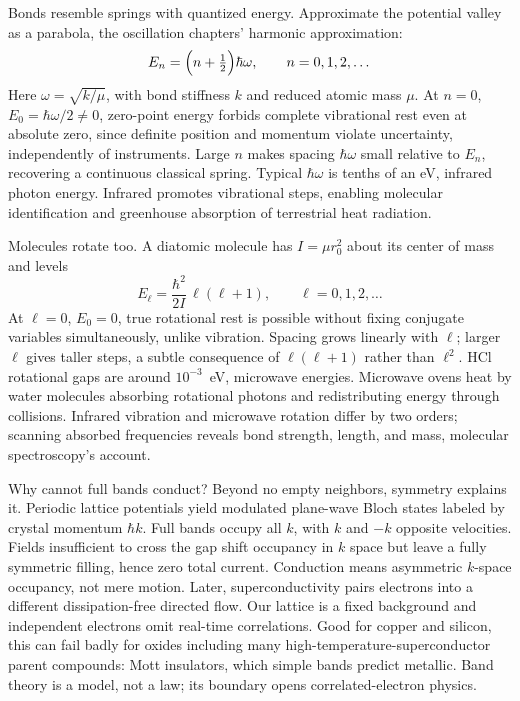 \begin{mathbridge}
Bonds resemble springs with quantized energy. Approximate the potential valley as a parabola, the oscillation chapters' harmonic approximation:
\[
E_n=\Bigl(n+\tfrac12\Bigr)\hbar\omega,\qquad n=0,1,2,\dots
\]
Here \(\omega=\sqrt{k/\mu}\), with bond stiffness \(k\) and reduced atomic mass \(\mu\). At \(n=0\), \(E_0=\hbar\omega/2\neq0\), zero-point energy forbids complete vibrational rest even at absolute zero, since definite position and momentum violate uncertainty, independently of instruments. Large \(n\) makes spacing \(\hbar\omega\) small relative to \(E_n\), recovering a continuous classical spring. Typical \(\hbar\omega\) is tenths of an eV, infrared photon energy. Infrared promotes vibrational steps, enabling molecular identification and greenhouse absorption of terrestrial heat radiation.

Molecules rotate too. A diatomic molecule has \(I=\mu r_0^2\) about its center of mass and levels
\[
E_\ell=\frac{\hbar^2}{2I}\,\ell(\ell+1),\qquad \ell=0,1,2,\dots
\]
At \(\ell=0\), \(E_0=0\), true rotational rest is possible without fixing conjugate variables simultaneously, unlike vibration. Spacing grows linearly with \(\ell\); larger \(\ell\) gives taller steps, a subtle consequence of \(\ell(\ell+1)\) rather than \(\ell^2\). HCl rotational gaps are around \(10^{-3}\)~eV, microwave energies. Microwave ovens heat by water molecules absorbing rotational photons and redistributing energy through collisions. Infrared vibration and microwave rotation differ by two orders; scanning absorbed frequencies reveals bond strength, length, and mass, molecular spectroscopy's account.
\end{mathbridge}

\begin{challenge}
Why cannot full bands conduct? Beyond no empty neighbors, symmetry explains it. Periodic lattice potentials yield modulated plane-wave Bloch states labeled by crystal momentum \(\hbar k\). Full bands occupy all \(k\), with \(k\) and \(-k\) opposite velocities. Fields insufficient to cross the gap shift occupancy in \(k\) space but leave a fully symmetric filling, hence zero total current. Conduction means asymmetric \(k\)-space occupancy, not mere motion. Later, superconductivity pairs electrons into a different dissipation-free directed flow. Our lattice is a fixed background and independent electrons omit real-time correlations. Good for copper and silicon, this can fail badly for oxides including many high-temperature-superconductor parent compounds: Mott insulators, which simple bands predict metallic. Band theory is a model, not a law; its boundary opens correlated-electron physics.
\end{challenge}


